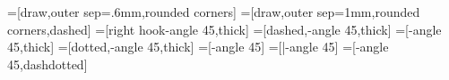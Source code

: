 \usetikzlibrary{arrows}
\newcommand{\mmtarrowtip}{angle 45}
\newcommand{\mmtreversearrowtip}{angle 45 reversed}
\newcommand{\mmtarrowtipepi}{triangle 45}
\newcommand{\mmtarrowtipmono}{right hook}
\newcommand\mmtthy[3]{\def\@test{#3}%
\begin{array}{l}\textsf{#1}\\\hline #2\ifx\@test\@empty\message{empty!}\else\message{nonempty!}\\\hline #3\fi\end{array}}
=[draw,outer sep=.6mm,rounded corners]
=[draw,outer sep=1mm,rounded corners,dashed]
=[\mmtarrowtipmono-\mmtarrowtip,thick]
=[dashed,-\mmtarrowtip,thick]
=[-\mmtarrowtip,thick]
=[dotted,-\mmtarrowtip,thick]
=[-\mmtarrowtip] %
=[|-\mmtarrowtip] %
=[-\mmtarrowtip,dashdotted] %

